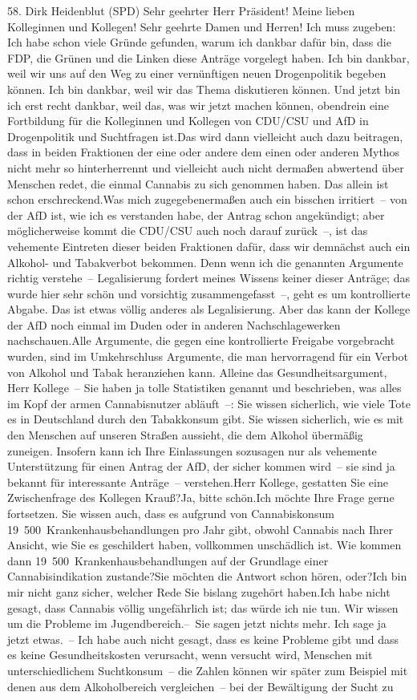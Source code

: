 \documentclass{article}
\begin{document}
	58. Dirk Heidenblut (SPD) Sehr geehrter Herr Präsident! Meine lieben Kolleginnen und Kollegen! Sehr geehrte Damen und Herren! Ich muss zugeben: Ich habe schon viele Gründe gefunden, warum ich dankbar dafür bin, dass die FDP, die Grünen und die Linken diese Anträge vorgelegt haben. Ich bin dankbar, weil wir uns auf den Weg zu einer vernünftigen neuen Drogenpolitik begeben können. Ich bin dankbar, weil wir das Thema diskutieren können. Und jetzt bin ich erst recht dankbar, weil das, was wir jetzt machen können, obendrein eine Fortbildung für die Kolleginnen und Kollegen von CDU/CSU und AfD in Drogenpolitik und Suchtfragen ist.Das wird dann vielleicht auch dazu beitragen, dass in beiden Fraktionen der eine oder andere dem einen oder anderen Mythos nicht mehr so hinterherrennt und vielleicht auch nicht dermaßen abwertend über Menschen redet, die einmal Cannabis zu sich genommen haben. Das allein ist schon erschreckend.Was mich zugegebenermaßen auch ein bisschen irritiert – von der AfD ist, wie ich es verstanden habe, der Antrag schon angekündigt; aber möglicherweise kommt die CDU/CSU auch noch darauf zurück –, ist das vehemente Eintreten dieser beiden Fraktionen dafür, dass wir demnächst auch ein Alkohol- und Tabakverbot bekommen. Denn wenn ich die genannten Argumente richtig verstehe – Legalisierung fordert meines Wissens keiner dieser Anträge; das wurde hier sehr schön und vorsichtig zusammengefasst –, geht es um kontrollierte Abgabe. Das ist etwas völlig anderes als Legalisierung. Aber das kann der Kollege der AfD noch einmal im Duden oder in anderen Nachschlagewerken nachschauen.Alle Argumente, die gegen eine kontrollierte Freigabe vorgebracht wurden, sind im Umkehrschluss Argumente, die man hervorragend für ein Verbot von Alkohol und Tabak heranziehen kann. Alleine das Gesundheitsargument, Herr Kollege – Sie haben ja tolle Statistiken genannt und beschrieben, was alles im Kopf der armen Cannabisnutzer abläuft –: Sie wissen sicherlich, wie viele Tote es in Deutschland durch den Tabakkonsum gibt. Sie wissen sicherlich, wie es mit den Menschen auf unseren Straßen aussieht, die dem Alkohol übermäßig zuneigen. Insofern kann ich Ihre Einlassungen sozusagen nur als vehemente Unterstützung für einen Antrag der AfD, der sicher kommen wird – sie sind ja bekannt für interessante Anträge – verstehen.Herr Kollege, gestatten Sie eine Zwischenfrage des Kollegen Krauß?Ja, bitte schön.Ich möchte Ihre Frage gerne fortsetzen. Sie wissen auch, dass es aufgrund von Cannabiskonsum 19 500 Krankenhausbehandlungen pro Jahr gibt, obwohl Cannabis nach Ihrer Ansicht, wie Sie es geschildert haben, vollkommen unschädlich ist. Wie kommen dann 19 500 Krankenhausbehandlungen auf der Grundlage einer Cannabisindikation zustande?Sie möchten die Antwort schon hören, oder?Ich bin mir nicht ganz sicher, welcher Rede Sie bislang zugehört haben.Ich habe nicht gesagt, dass Cannabis völlig ungefährlich ist; das würde ich nie tun. Wir wissen um die Probleme im Jugendbereich.– Sie sagen jetzt nichts mehr. Ich sage ja jetzt etwas. – Ich habe auch nicht gesagt, dass es keine Probleme gibt und dass es keine Gesundheitskosten verursacht, wenn versucht wird, Menschen mit unterschiedlichem Suchtkonsum – die Zahlen können wir später zum Beispiel mit denen aus dem Alkoholbereich vergleichen – bei der Bewältigung der Sucht zu 
\end{document}
